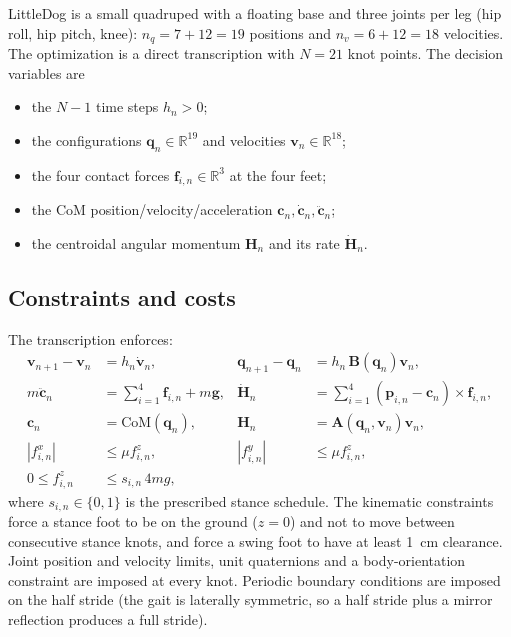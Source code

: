 \documentclass[11pt]{article}
\newcommand{\bp}{\mathbf{p}}
\newcommand{\bq}{\mathbf{q}}
\newcommand{\bv}{\mathbf{v}}
\newcommand{\bB}{\mathbf{B}}
\begin{document}
LittleDog is a small quadruped with a floating base and three joints per leg
(hip roll, hip pitch, knee): $n_q=7+12=19$ positions and $n_v=6+12=18$
velocities.  The optimization is a direct transcription with $N=21$ knot
points.  The decision variables are
\begin{itemize}[leftmargin=1.5em]
  \item the $N-1$ time steps $h_n>0$;
  \item the configurations $\bq_n\in\mathbb{R}^{19}$ and velocities
        $\bv_n\in\mathbb{R}^{18}$;
  \item the four contact forces $\mathbf{f}_{i,n}\in\mathbb{R}^3$ at the four
        feet;
  \item the CoM position/velocity/acceleration $\mathbf{c}_n,\dot{\mathbf{c}}_n,
        \ddot{\mathbf{c}}_n$;
  \item the centroidal angular momentum $\mathbf{H}_n$ and its rate
        $\dot{\mathbf{H}}_n$.
\end{itemize}

\subsection{Constraints and costs}

The transcription enforces:
\begin{align}
\bv_{n+1}-\bv_n &= h_n\dot{\bv}_n, &
\bq_{n+1}-\bq_n &= h_n\,\bB(\bq_n)\bv_n, \label{eq:little_dyn}\\
m\ddot{\mathbf{c}}_n &= \sum_{i=1}^{4}\mathbf{f}_{i,n}+m\mathbf{g}, &
\dot{\mathbf{H}}_n &= \sum_{i=1}^{4}
   (\bp_{i,n}-\mathbf{c}_n)\times\mathbf{f}_{i,n}, \label{eq:little_com}\\
\mathbf{c}_n &= \mathrm{CoM}(\bq_n), &
\mathbf{H}_n &= \mathbf{A}(\bq_n,\bv_n)\bv_n, \label{eq:little_centroidal}\\
|f_{i,n}^{x}|&\le\mu f_{i,n}^{z}, &
|f_{i,n}^{y}|&\le\mu f_{i,n}^{z}, \label{eq:little_friction}\\
0\le f_{i,n}^{z}&\le s_{i,n}\,4mg, \label{eq:little_normal}
\end{align}
where $s_{i,n}\in\{0,1\}$ is the prescribed stance schedule.  The kinematic
constraints force a stance foot to be on the ground ($z=0$) and not to move
between consecutive stance knots, and force a swing foot to have at least
1~cm clearance.  Joint position and velocity limits, unit quaternions and a
body-orientation constraint are imposed at every knot.  Periodic boundary
conditions are imposed on the half stride (the gait is laterally symmetric,
so a half stride plus a mirror reflection produces a full stride).
\end{document}
